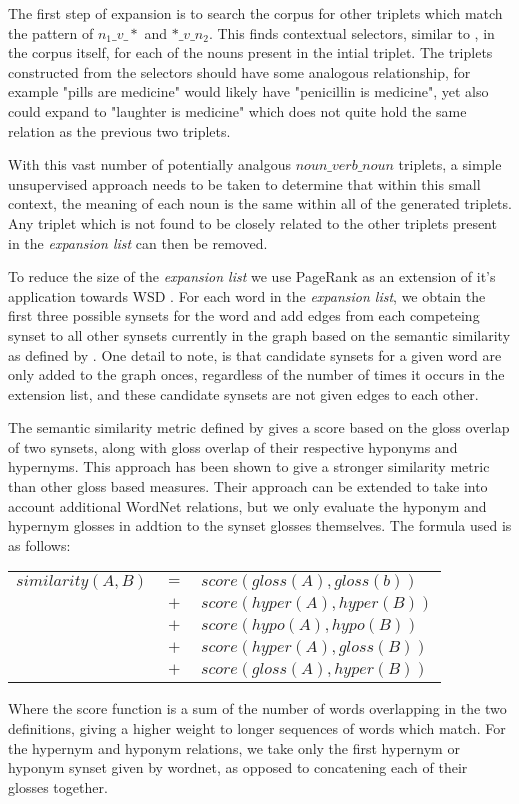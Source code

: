 \documentclass[11pt]{article}
\begin{document}
The first step of expansion is to search the corpus for other triplets which match
the pattern of $n_1\_v\_*$ and $*\_v\_n_2$.  This finds contextual
selectors, similar to \cite{schwartz08selectors}, in the corpus itself, for each of
the nouns present in the intial triplet.  The triplets constructed from the
selectors should have some analogous relationship, for example "pills are 
medicine" would likely have "penicillin is medicine", yet also could expand to
"laughter is medicine" which does not quite hold the same relation as the
previous two triplets.  

With this vast number of potentially analgous $noun\_verb\_noun$ triplets, a
simple unsupervised approach needs to be taken to determine that within this
small context, the meaning of each noun is the same
within all of the generated triplets.  Any triplet which is not found to be
closely related to the other triplets present in the \emph{expansion list} can then be
removed.

To reduce the size of the \emph{expansion list} we use PageRank as an extension of it's application towards WSD
\cite{mihalcea04wsdpagerank,mihalcea06randomwalks}.  For each word in
the \emph{expansion list}, we obtain the first three possible synsets for the word and
add edges from each competeing synset to all other synsets currently in the
graph based on the semantic similarity as defined by
\cite{banerjee03extendedgloss}.  One detail to note, is that candidate synsets
for a given word are only added to the graph onces, regardless of the number of
times it occurs in the extension list, and these candidate synsets are not
given edges to each other. 

The semantic similarity metric defined by \cite{banerjee03extendedgloss} gives a
score based on the gloss overlap of two synsets, along with gloss overlap of
their respective hyponyms and hypernyms.  This approach has been shown to give a
stronger similarity metric than other gloss based measures.  Their approach can be extended to take
into account additional WordNet relations, but we only evaluate the hyponym and
hypernym glosses in addtion to the synset glosses themselves.  The formula
used is as follows:

{\small
  \begin{tabular}{lcl}    
    $similarity(A, B)$ & $=$ & $score(gloss(A), gloss(b))$ \\
    & $+$ & $score(hyper(A), hyper(B))$ \\
    & $+$ & $score(hypo(A), hypo(B))$ \\
    & $+$ & $score(hyper(A), gloss(B))$ \\
    & $+$ & $score(gloss(A), hyper(B))$  \\
  \end{tabular}
}
\normalsize
Where the score function is a sum of the number of words overlapping in the two
definitions, giving a higher weight to longer sequences of words which match.
For the hypernym and hyponym relations, we take only the first hypernym or hyponym
synset given by wordnet, as opposed to concatening each of their glosses together.  
\end{document}
